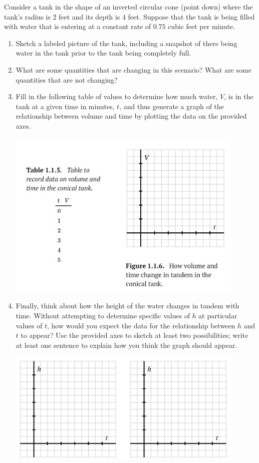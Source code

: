\documentclass{ximera}
\begin{document}
\begin{tcolorbox}[colback=yellow!15, breakable,pad at break*=1mm]
\begin{example}
Consider a tank in the shape of an inverted circular cone (point down) where the tank's radius is \(2\) feet and its depth is \(4\) feet.  Suppose that the tank is being filled with water that is entering at a constant rate of \(0.75\) cubic feet per minute.%
\begin{enumerate}[label=\alph*.]
\item Sketch a labeled picture of the tank, including a snapshot of there being water in the tank prior to the tank being completely full.%
\item What are some quantities that are changing in this scenario?  What are some quantities that are not changing?%
\item Fill in the following table of values to determine how much water, \(V\), is in the tank at a given time in minutes, \(t\), and thus generate a graph of the relationship between volume and time by plotting the data on the provided axes.%

\includegraphics[width=0.9\textwidth]{APCfigure1.1.5.jpg}

\item Finally, think about how the height of the water changes in tandem with time.  Without attempting to determine specific values of \(h\) at particular values of \(t\), how would you expect the data for the relationship between \(h\) and \(t\) to appear?  Use the provided axes to sketch at least two possibilities; write at least one sentence to explain how you think the graph should appear.%

\includegraphics[width=0.9\textwidth]{APCfigure1.1.blank.jpg}


\end{enumerate}
\end{example}
\end{tcolorbox}
\end{document}
